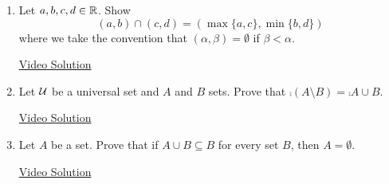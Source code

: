 \begin{enumerate}
\item Let $a,b,c,d \in \mathbb{R}$. Show
\[
(a,b) \cap (c,d) = (\max\{a,c\}, \min\{b,d\})
\]
where we take the convention that $(\alpha, \beta) = \emptyset$ if $\beta < \alpha$.

\href{https://youtu.be/zBbGQv8ghsY}{Video Solution}

\item Let $\mathcal{U}$ be a universal set and $A$ and $B$ sets. Prove that $\comp{(A \setminus B)} = \comp{A} \cup B$.

\href{https://youtu.be/kZ6nheFBrM8}{Video Solution}

\item Let $A$ be a set. Prove that if $A \cup B \subseteq B$ for every set $B$, then $A = \emptyset$.

\href{https://youtu.be/CfzvERcv4xc}{Video Solution}
\end{enumerate}